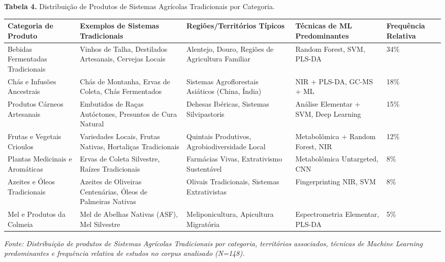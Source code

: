 \textbf{Tabela 4.} Distribuição de Produtos de Sistemas Agrícolas Tradicionais por Categoria.

\begin{table}[h]
\centering
\small
\begin{tabular}{|l|l|l|l|l|}
\hline
\textbf{Categoria de Produto} & \textbf{Exemplos de Sistemas Tradicionais} & \textbf{Regiões/Territórios Típicos} & \textbf{Técnicas de ML Predominantes} & \textbf{Frequência Relativa} \\ \hline
Bebidas Fermentadas Tradicionais & Vinhos de Talha, Destilados Artesanais, Cervejas Locais & Alentejo, Douro, Regiões de Agricultura Familiar & Random Forest, SVM, PLS-DA & 34\% \\ \hline
Chás e Infusões Ancestrais & Chás de Montanha, Ervas de Coleta, Chás Fermentados & Sistemas Agroflorestais Asiáticos (China, Índia) & NIR + PLS-DA, GC-MS + ML & 18\% \\ \hline
Produtos Cárneos Artesanais & Embutidos de Raças Autóctones, Presuntos de Cura Natural & Dehesas Ibéricas, Sistemas Silvipastoris & Análise Elementar + SVM, Deep Learning & 15\% \\ \hline
Frutas e Vegetais Crioulos & Variedades Locais, Frutas Nativas, Hortaliças Tradicionais & Quintais Produtivos, Agrobiodiversidade Local & Metabolômica + Random Forest, NIR & 12\% \\ \hline
Plantas Medicinais e Aromáticas & Ervas de Coleta Silvestre, Raízes Tradicionais & Farmácias Vivas, Extrativismo Sustentável & Metabolômica Untargeted, CNN & 8\% \\ \hline
Azeites e Óleos Tradicionais & Azeites de Oliveiras Centenárias, Óleos de Palmeiras Nativas & Olivais Tradicionais, Sistemas Extrativistas & Fingerprinting NIR, SVM & 8\% \\ \hline
Mel e Produtos da Colmeia & Mel de Abelhas Nativas (ASF), Mel Silvestre & Meliponicultura, Apicultura Migratória & Espectrometria Elementar, PLS-DA & 5\% \\ \hline
\end{tabular}
\end{table}

\emph{Fonte: Distribuição de produtos de Sistemas Agrícolas Tradicionais por categoria, territórios associados, técnicas de Machine Learning predominantes e frequência relativa de estudos no corpus analisado (N=148).}

